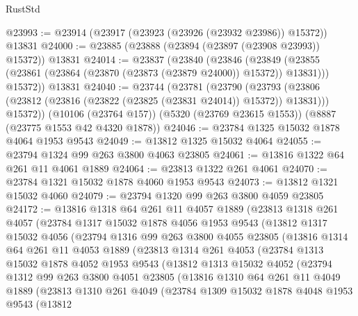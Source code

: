 \begin{lexlean}{RustStd}
\begin{coremodule}
@23993 := @23914 (@23917 (@23923 (@23926 (@23932 @23986)) @15372)) @13831
@24000 := @23885 (@23888 (@23894 (@23897 (@23908 @23993)) @15372)) @13831
@24014 := @23837
    (@23840
      (@23846
        (@23849 (@23855 (@23861 (@23864 (@23870 (@23873 (@23879 @24000)) @15372)) @13831)))
        @15372))
    @13831
@24040 := @23744
    (@23781
      (@23790
        (@23793 (@23806 (@23812 (@23816 (@23822 (@23825 (@23831 @24014)) @15372)) @13831)))
        @15372))
    (@10106 (@23764 @157))
    (@5320 (@23769 @23615 @1553))
    (@8887 (@23775 @1553 @42 @4320 @1878))
@24046 := @23784 @1325 @15032 @1878 @4064 @1953 @9543
@24049 := @13812 @1325 @15032 @4064
@24055 := @23794 @1324 @99 @263 @3800 @4063 @23805
@24061 := @13816 @1322 @64 @261 @11 @4061 @1889
@24064 := @23813 @1322 @261 @4061
@24070 := @23784 @1321 @15032 @1878 @4060 @1953 @9543
@24073 := @13812 @1321 @15032 @4060
@24079 := @23794 @1320 @99 @263 @3800 @4059 @23805
@24172 := @13816
    @1318
    @64
    @261
    @11
    @4057
    @1889
    (@23813
      @1318
      @261
      @4057
      (@23784
        @1317
        @15032
        @1878
        @4056
        @1953
        @9543
        (@13812
          @1317
          @15032
          @4056
          (@23794
            @1316
            @99
            @263
            @3800
            @4055
            @23805
            (@13816
              @1314
              @64
              @261
              @11
              @4053
              @1889
              (@23813
                @1314
                @261
                @4053
                (@23784
                  @1313
                  @15032
                  @1878
                  @4052
                  @1953
                  @9543
                  (@13812
                    @1313
                    @15032
                    @4052
                    (@23794
                      @1312
                      @99
                      @263
                      @3800
                      @4051
                      @23805
                      (@13816
                        @1310
                        @64
                        @261
                        @11
                        @4049
                        @1889
                        (@23813
                          @1310
                          @261
                          @4049
                          (@23784
                            @1309
                            @15032
                            @1878
                            @4048
                            @1953
                            @9543
                            (@13812

\end{coremodule}
\end{lexlean}
